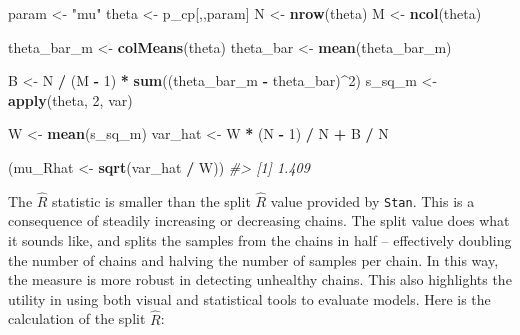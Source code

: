 \documentclass[11pt, oneside, openany]{scrbook}
\newenvironment{Shaded}{\begin{snugshade}}{\end{snugshade}}
\newcommand{\CommentTok}[1]{\textcolor[rgb]{0.56,0.35,0.01}{\textit{#1}}}
\newcommand{\DecValTok}[1]{\textcolor[rgb]{0.00,0.00,0.81}{#1}}
\newcommand{\FunctionTok}[1]{\textcolor[rgb]{0.13,0.29,0.53}{\textbf{#1}}}
\newcommand{\NormalTok}[1]{#1}
\newcommand{\OtherTok}[1]{\textcolor[rgb]{0.56,0.35,0.01}{#1}}
\newcommand{\SpecialCharTok}[1]{\textcolor[rgb]{0.81,0.36,0.00}{\textbf{#1}}}
\newcommand{\StringTok}[1]{\textcolor[rgb]{0.31,0.60,0.02}{#1}}
\begin{document}
\begin{Shaded}
\begin{Highlighting}[]
\NormalTok{param }\OtherTok{\textless{}{-}} \StringTok{"mu"}
\NormalTok{theta }\OtherTok{\textless{}{-}}\NormalTok{ p\_cp[,,param]}
\NormalTok{N     }\OtherTok{\textless{}{-}} \FunctionTok{nrow}\NormalTok{(theta)}
\NormalTok{M     }\OtherTok{\textless{}{-}} \FunctionTok{ncol}\NormalTok{(theta)}

\NormalTok{theta\_bar\_m }\OtherTok{\textless{}{-}} \FunctionTok{colMeans}\NormalTok{(theta)}
\NormalTok{theta\_bar   }\OtherTok{\textless{}{-}} \FunctionTok{mean}\NormalTok{(theta\_bar\_m)}

\NormalTok{B }\OtherTok{\textless{}{-}}\NormalTok{ N }\SpecialCharTok{/}\NormalTok{ (M }\SpecialCharTok{{-}} \DecValTok{1}\NormalTok{) }\SpecialCharTok{*} \FunctionTok{sum}\NormalTok{((theta\_bar\_m }\SpecialCharTok{{-}}\NormalTok{ theta\_bar)}\SpecialCharTok{\^{}}\DecValTok{2}\NormalTok{)}
\NormalTok{s\_sq\_m }\OtherTok{\textless{}{-}} \FunctionTok{apply}\NormalTok{(theta, }\DecValTok{2}\NormalTok{, var)}

\NormalTok{W }\OtherTok{\textless{}{-}} \FunctionTok{mean}\NormalTok{(s\_sq\_m)}
\NormalTok{var\_hat }\OtherTok{\textless{}{-}}\NormalTok{ W }\SpecialCharTok{*}\NormalTok{ (N }\SpecialCharTok{{-}} \DecValTok{1}\NormalTok{) }\SpecialCharTok{/}\NormalTok{ N }\SpecialCharTok{+}\NormalTok{ B }\SpecialCharTok{/}\NormalTok{ N}

\NormalTok{(mu\_Rhat }\OtherTok{\textless{}{-}} \FunctionTok{sqrt}\NormalTok{(var\_hat }\SpecialCharTok{/}\NormalTok{ W))}
\CommentTok{\#\textgreater{} [1] 1.409}
\end{Highlighting}
\end{Shaded}


The \(\hat{R}\) statistic is smaller than the split \(\hat{R}\) value provided by \texttt{Stan}. This is a consequence of steadily increasing or decreasing chains. The split value does what it sounds like, and splits the samples from the chains in half -- effectively doubling the number of chains and halving the number of samples per chain. In this way, the measure is more robust in detecting unhealthy chains. This also highlights the utility in using both visual and statistical tools to evaluate models. Here is the calculation of the split \(\hat{R}\):

\end{document}

